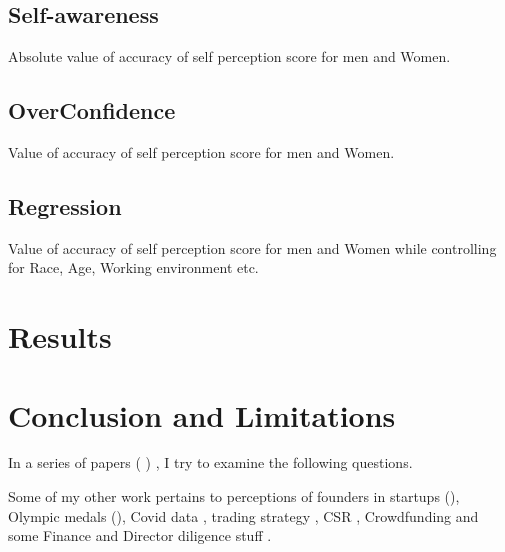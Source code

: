 \documentclass[
]{article}
\begin{document}
\subsection{Self-awareness}

Absolute value of accuracy of self perception score for men and Women.

\subsection{OverConfidence}

Value of accuracy of self perception score for men and Women.

\subsection{Regression}

Value of accuracy of self perception score for men and Women while controlling for Race, Age, Working environment etc.

\section{Results}

\section{Conclusion and Limitations}

In a series of papers (\citet{singh2021make} ) , I try to examine the following questions.

Some of my other work pertains to perceptions of founders in startups (\citep{singh2021perception1, singh2021perception2, singh2021perception3, singh2021perception4, singh2021perception5, singh2021start}), Olympic medals (\citep{singh2021olympic, singh2021names}), Covid data \citep{singh2020close, singh2020quantifying}, trading strategy \citep{singh2015square}, CSR \citep{singh2016whether}, Crowdfunding \citep{singh2021crowdfunding, singh2021emotional} and some Finance and Director diligence stuff \citep{singh2016impact, singh2016executive, singh2017essay} .

  
\end{document}
